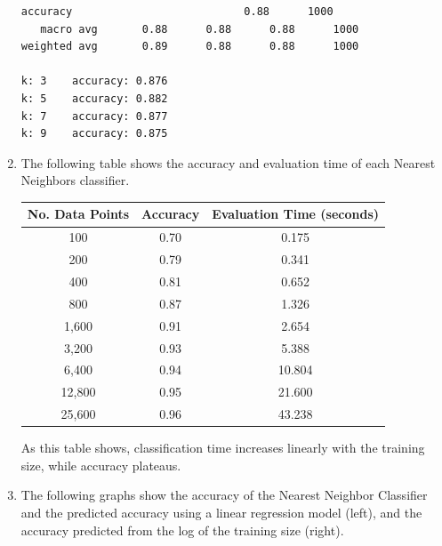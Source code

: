 \documentclass{article}
\begin{document}
\begin{enumerate}[start=1]
\begin{Verbatim}[commandchars=+\[\]]
    accuracy                           0.88      1000
   macro avg       0.88      0.88      0.88      1000
weighted avg       0.89      0.88      0.88      1000

k: 3	accuracy: 0.876
k: 5	accuracy: 0.882
k: 7	accuracy: 0.877
k: 9	accuracy: 0.875
    \end{Verbatim}
    
\newpage

\item %
    The following table shows the accuracy and evaluation time of each Nearest Neighbors classifier.
    
    \begin{tabular}{| c | c | c |}
    \hline
    \textbf{No. Data Points} & \textbf{Accuracy} & \textbf{Evaluation Time (seconds)} \\
    \hline
    100 & 0.70 & 0.175 \\
    \hline
    200 & 0.79 & 0.341 \\
    \hline
    400 & 0.81 & 0.652 \\
    \hline
    800 & 0.87 & 1.326 \\
    \hline
    1,600 & 0.91 & 2.654 \\
    \hline
    3,200 & 0.93 & 5.388 \\
    \hline
    6,400 & 0.94 & 10.804 \\
    \hline
    12,800 & 0.95 & 21.600 \\
    \hline
    25,600 & 0.96 & 43.238 \\
    \hline
    \end{tabular}
    
    As this table shows, classification time increases linearly with the training size, while accuracy plateaus.
    
\item %
    The following graphs show the accuracy of the Nearest Neighbor Classifier and the predicted accuracy using a linear regression model (left), and the accuracy predicted from the log of the training size (right).
    

\end{enumerate}
\end{document}
